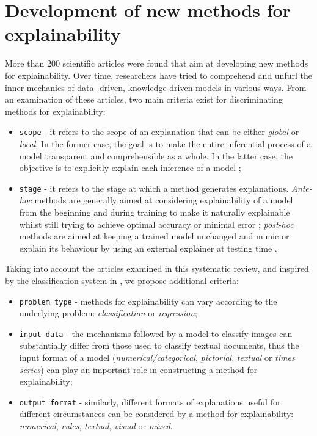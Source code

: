 \documentclass[final,1p,times]{elsarticle}
\begin{document}
\section{Development of new methods for explainability}\label{newmethods}
More than 200 scientific articles were found that aim at developing new methods for explainability. Over time, researchers have tried to comprehend and unfurl the inner mechanics of data- driven, knowledge-driven models in various ways. 
From an examination of these articles, two main criteria exist for discriminating methods for explainability: 
\begin{itemize}
\item {\verb|scope|} - it refers to the scope of an explanation that can be either \textit{global} or \textit{local}. In the former case, the goal is to make the entire inferential process of a model transparent and comprehensible as a whole. In the latter case, the objective is to explicitly explain each inference of a model   \cite{bengio2013representation, dam2018explainable, lipton2018mythos, samek2019towards};
\item {\verb|stage|} - it refers to the stage at which a method generates explanations. \textit{Ante-hoc} methods are generally aimed at considering explainability of a model from the beginning and during training to make it naturally explainable whilst still trying to achieve optimal accuracy or minimal error \cite{dovsilovic2018explainable, lou2012intelligible, lou2013accurate}; \textit{post-hoc} methods are aimed at keeping a trained model unchanged and mimic or explain its behaviour by using an external explainer at testing time \cite{dovsilovic2018explainable, lipton2018mythos, montavon2017methods, paez2019pragmatic}.
\end{itemize}

Taking into account the articles examined in this systematic review, and inspired by the classification  system in \cite{guidotti2018survey}, we propose additional criteria:
\begin{itemize}
\item {\verb|problem type|} - methods for explainability can vary according to the underlying problem: \textit{classification} or \textit{regression};
\item {\verb|input data|} - the mechanisms followed by a model to classify images can substantially differ from those used to classify textual documents, thus the input format of a model (\textit{numerical/categorical}, \textit{pictorial}, \textit{textual} or \textit{times series}) can play an important role in constructing a method for explainability;
\item {\verb|output format|} - similarly, different formats of explanations useful for different circumstances can be considered by a method for explainability: \textit{numerical}, \textit{rules}, \textit{textual}, \textit{visual} or \textit{mixed}.
\end{itemize}
\end{document}
